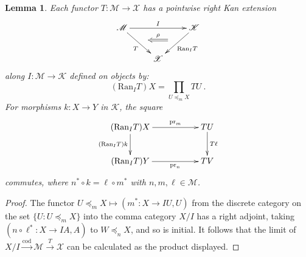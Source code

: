 \documentclass[a4paper,12pt,reqno]{amsart}
\newtheorem{lemma}[theorem]{Lemma}
\theoremstyle{definition}
\theoremstyle{fact}
\theoremstyle{genquest}
\theoremstyle{step}
\newcommand{\dd}{\colon}
\newcommand{\lra}{\longrightarrow}
\newcommand{\ra}{\rightarrow}
\def\CK{{\mathscr K}}
\def\CM{{\mathscr M}}
\def\CX{{\mathscr X}}
\begin{document}
\begin{lemma}
Each functor $T\dd \CM \ra \CX$ has a pointwise right Kan extension
\begin{equation}
\begin{aligned}
\xymatrix{
\CM \ar[rd]_{T}^(0.5){\phantom{a}}="1" \ar[rr]^{I}  && \CK \ar[ld]^{\mathrm{Ran}_IT}_(0.5){\phantom{a}}="2" \ar@{<=}"1";"2"^-{\rho}
\\
& \CX 
}
\end{aligned}
\end{equation}  
along $I\dd \CM \ra \CK$ defined on objects by:
$$(\mathrm{Ran}_IT)X = \prod_{U\preceq_m X}TU \ .$$
For morphisms $k \dd X\ra Y$ in $\CK$, the square
\begin{equation}
\begin{aligned}
\xymatrix{
(\mathrm{Ran}_IT)X \ar[rr]^-{\mathrm{pr}_{m}} \ar[d]_-{(\mathrm{Ran}_IT)k} && TU \ar[d]^-{T\ell} \\
(\mathrm{Ran}_IT)Y \ar[rr]_-{\mathrm{pr}_n} && TV 
}
\end{aligned}
\end{equation}
commutes, where $n^*\circ k = \ell \circ m^*$ with $n, m, \ell \in \CM$.
\end{lemma}
\begin{proof}
The functor $U\preceq_m X \mapsto (m^* \dd X\ra IU, U)$ from the discrete category 
on the set $\{U \dd U\preceq_m X\}$ into the comma category
$X/I$ has a right adjoint, taking $(n\circ \ell^* \dd X\ra IA,A)$ to $W\preceq_n X$, and so is initial. 
It follows that the limit of 
$X/I \stackrel{\mathrm{cod}}\lra \CM \stackrel{T}\lra \CX$
can be calculated as the product displayed.
\end{proof}
\end{document}

